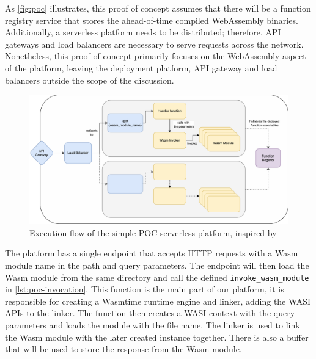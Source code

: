As \autoref{fig:poc} illustrates, this proof of concept assumes that there will be a function registry service that stores the ahead-of-time compiled \gls{WebAssembly} binaries. Additionally, a serverless platform needs to be distributed; therefore, API gateways and load balancers are necessary to serve requests across the network. Nonetheless, this proof of concept primarily focuses on the WebAssembly aspect of the platform, leaving the deployment platform, API gateway and load balancers outside the scope of the discussion. 
%
\begin{figure}[htbp]
	\centering
		\includegraphics[width=1\linewidth]{images/poc/poc.pdf}
	\caption{Execution flow of the simple POC serverless platform, inspired by \cite[p. 142]{gackstatter_2022_pushing}}
	\label{fig:poc}
\end{figure}
%
The platform has a single endpoint that accepts HTTP requests with a Wasm module name in the path and query parameters. The endpoint will then load the Wasm module from the same directory and call the defined \texttt{invoke\_wasm\_module} in \autoref{lst:poc-invocation}. This function is the main part of our platform, it is responsible for creating a Wasmtime runtime engine and linker, adding the WASI APIs to the linker. The function then creates a WASI context with the query parameters and loads the module with the file name. The linker is used to link the Wasm module with the later created instance together. There is also a buffer that will be used to store the response from the Wasm module.
%
